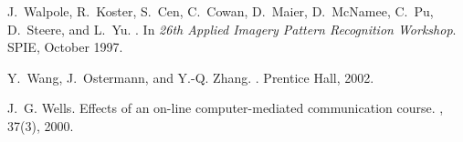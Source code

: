 \documentclass{sig-alternate}
\begin{document}
\begin{thebibliography}{10}
J.~Walpole, R.~Koster, S.~Cen, C.~Cowan, D.~Maier, D.~McNamee, C.~Pu,
  D.~Steere, and L.~Yu.
.
\newblock In {\em 26th Applied Imagery Pattern Recognition Workshop}. SPIE,
  October 1997.

Y.~Wang, J.~Ostermann, and Y.-Q. Zhang.
.
\newblock Prentice Hall, 2002.

J.~G. Wells.
\newblock Effects of an on-line computer-mediated communication course.
, 37(3), 2000.

\end{thebibliography}


\balancecolumns %
\end{document}
